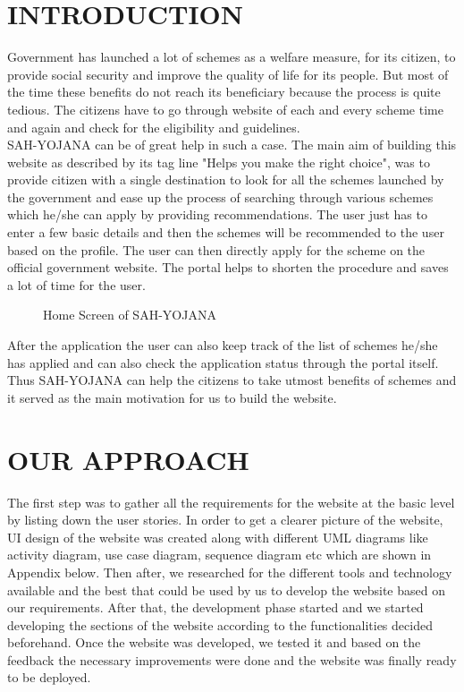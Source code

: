 \documentclass[conference]{IEEEtran}
\begin{document}
\section{INTRODUCTION}
Government has launched a lot of schemes as a welfare measure, for its citizen, to provide social security and improve the quality of life for its people. But most of the time these benefits do not reach its beneficiary because the process is quite tedious. The citizens have to go through website of each and every scheme time and again and check for the eligibility and guidelines.\\ SAH-YOJANA can be of great help in such a case. The main aim of building this website as described by its tag line "Helps you make the right choice", was to provide citizen with a single destination to look for all the schemes launched by the government and ease up the process of searching through various schemes which he/she can apply by providing recommendations. The user just has to enter a few basic details and then the schemes will be recommended to the user based on the profile. The user can then directly apply for the scheme on the official government website. The portal helps to shorten the procedure and saves a lot of time for the user. 
\begin{figure}[h!]
\centering
{}
\caption{Home Screen of SAH-YOJANA}
\end{figure}
After the application the user can also keep track of the list of schemes he/she has applied and can also check the application status through the portal itself. Thus SAH-YOJANA can help the citizens to take utmost benefits of schemes and it served as the main motivation for us to build the website. 


\section{OUR APPROACH}
The first step was to gather all the requirements for the website at the basic level by listing down the user stories. In order to get a clearer picture of the website, UI design of the website was created along with different UML diagrams like activity diagram, use case diagram, sequence diagram etc which are shown in Appendix below. Then after, we researched for the different tools and technology available and the best that could be used by us to develop the website based on our requirements. After that, the development phase started and we started developing the sections of the website according to the functionalities decided beforehand. Once the website was developed, we tested it and based on the feedback the necessary improvements were done and the website was finally ready to be deployed.
\end{document}

